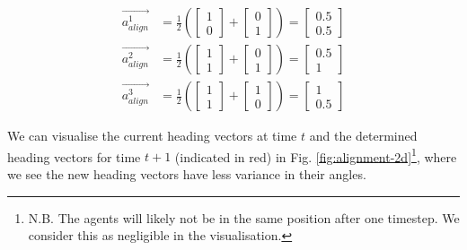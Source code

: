 \documentclass[12pt]{article}
\begin{document}
\begin{equation}
    \begin{aligned}
        \vec{a_{align}^1} &= \frac{1}{2} \left( \begin{bmatrix} 1 \\ 0 \end{bmatrix} + \begin{bmatrix} 0 \\ 1 \end{bmatrix} \right) = \begin{bmatrix} 0.5 \\ 0.5 \end{bmatrix} \\
        \vec{a_{align}^2} &= \frac{1}{2} \left( \begin{bmatrix} 1 \\ 1 \end{bmatrix} + \begin{bmatrix} 0 \\ 1 \end{bmatrix} \right) = \begin{bmatrix} 0.5 \\ 1 \end{bmatrix} \\
        \vec{a_{align}^3} &= \frac{1}{2} \left( \begin{bmatrix} 1 \\ 1 \end{bmatrix} + \begin{bmatrix} 1 \\ 0 \end{bmatrix} \right) = \begin{bmatrix} 1 \\ 0.5 \end{bmatrix}
    \end{aligned}
\end{equation}

We can visualise the current heading vectors at time $t$ and the determined heading vectors for time $t+1$ (indicated in red) in Fig. \ref{fig:alignment-2d}\footnote{N.B. The agents will likely not be in the same position after one timestep. We consider this as negligible in the visualisation.}, where we see the new heading vectors have less variance in their angles.
\end{document}
